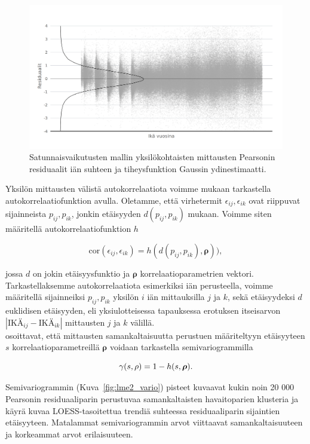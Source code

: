 \documentclass[finnish]{docopts}
\begin{document}
\begin{figure}[H]
\centering
  \includegraphics[scale=0.8]{kuvaajat/lme2_ika_residuaalit.png}
  \caption{Satunnaisvaikutusten mallin yksilökohtaisten mittausten Pearsonin residuaalit iän suhteen ja tiheysfunktion Gaussin ydinestimaatti.}
  \label{fig:lme2_ika_resid}
\end{figure}

Yksilön mittausten välistä autokorrelaatiota voimme \cite{pinheiro00} mukaan tarkastella autokorrelaatiofunktion avulla. Oletamme, että virhetermit $\epsilon_{ij}, \epsilon_{ik}$ ovat riippuvat sijainneista $p_{ij}, p_{ik}$, jonkin etäisyyden $d(p_{ij}, p_{ik})$ mukaan. Voimme siten määritellä autokorrelaatiofunktion $h$

$$
\text{cor}(\epsilon_{ij}, \epsilon_{ik}) = h(d(p_{ij}, p_{ik}), \bm{\rho})),
$$

jossa $d$ on jokin etäisyysfunktio ja $\bm{\rho}$ korrelaatioparametrien vektori.\\

Tarkastellaksemme autokorrelaatiota esimerkiksi iän perusteella, voimme määritellä sijainneiksi $p_{ij}, p_{ik}$ yksilön $i$ iän mittauksilla $j$ ja $k$, sekä etäisyydeksi $d$ euklidisen etäisyyden, eli yksiulotteisessa tapauksessa erotuksen itseisarvon $|\text{IKÄ}_{ij} - \text{IKÄ}_{ik}|$ mittausten $j$ ja $k$ välillä.\\ 

\cite{pinheiro00} osoittavat, että mittausten samankaltaisuutta perustuen määriteltyyn etäisyyteen $s$ korrelaatioparametreillä $\bm{\rho}$ voidaan tarkastella semivariogrammilla

$$
\gamma(s, \rho) = 1 - h(s, \bm{\rho})\\.
$$

Semivariogrammin (Kuva~\ref{fig:lme2_vario}) pisteet kuvaavat kukin noin 20 000 Pearsonin residuaaliparin perustuvaa samankaltaisten havaitoparien klusteria ja käyrä kuvaa LOESS-tasoitettua trendiä suhteessa residuaaliparin sijaintien etäisyyteen. Matalammat semivariogrammin arvot viittaavat samankaltaisuuteen ja korkeammat arvot erilaisuuteen.\\
\end{document}
